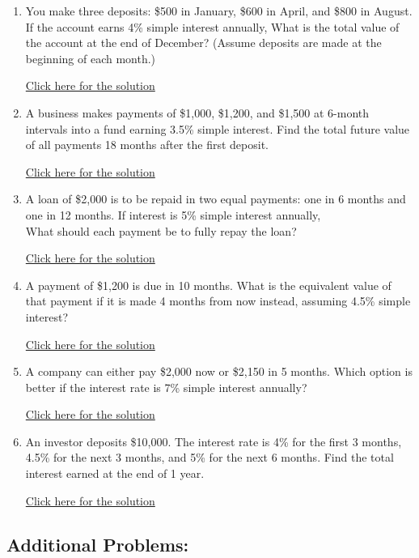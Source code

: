 \documentclass[
]{book}
\providecommand{\tightlist}{%
  \setlength{\itemsep}{0pt}\setlength{\parskip}{0pt}}
\begin{document}
\begin{enumerate}
\def\labelenumi{\arabic{enumi}.}
\tightlist
\item
  You make three deposits: \$500 in January, \$600 in April, and \$800 in August. If the account earns 4\% simple interest annually, What is the total value of the account at the end of December? (Assume deposits are made at the beginning of each month.)

  \href{https://youtu.be/L4L2EDaw0Bc}{Click here for the solution}
\item
  A business makes payments of \$1,000, \$1,200, and \$1,500 at 6-month intervals into a fund earning 3.5\% simple interest. Find the total future value of all payments 18 months after the first deposit.

  \href{https://youtu.be/_c-59B-eq24}{Click here for the solution}
\item
  A loan of \$2,000 is to be repaid in two equal payments: one in 6 months and one in 12 months. If interest is 5\% simple interest annually,\\
  What should each payment be to fully repay the loan?

  \href{https://youtu.be/QK3yk1NInE4}{Click here for the solution}
\item
  A payment of \$1,200 is due in 10 months. What is the equivalent value of that payment if it is made 4 months from now instead, assuming 4.5\% simple interest?

  \href{https://youtu.be/Ggslh8jfGrk}{Click here for the solution}
\item
  A company can either pay \$2,000 now or \$2,150 in 5 months. Which option is better if the interest rate is 7\% simple interest annually?

  \href{https://youtu.be/e_qfCFdWR4A}{Click here for the solution}
\item
  An investor deposits \$10,000. The interest rate is 4\% for the first 3 months, 4.5\% for the next 3 months, and 5\% for the next 6 months. Find the total interest earned at the end of 1 year.

  \href{https://youtu.be/PunaGnanvsA}{Click here for the solution}
\end{enumerate}

\subsection*{Additional Problems:}\label{additional-problems-8}
\end{document}
